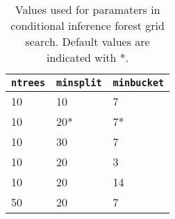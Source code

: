 \begin{table}[H]
    \centering
    \begin{tabular}{|p{3cm}|p{3cm}|p{3cm}|}
        \hline
        \texttt{ntrees} & \texttt{minsplit} & \texttt{minbucket} \\
        \hline
        \hline
        10 & 10 & 7 \\
        10 & 20* & 7* \\
        10 & 30 & 7 \\
        10 & 20 & 3 \\
        10 & 20 & 14 \\
        50 & 20 & 7 \\
        \hline
    \end{tabular}
    \caption{Values used for paramaters in conditional inference forest grid search. Default values are indicated with *.}
    \label{tab:cforest_params}
\end{table}
